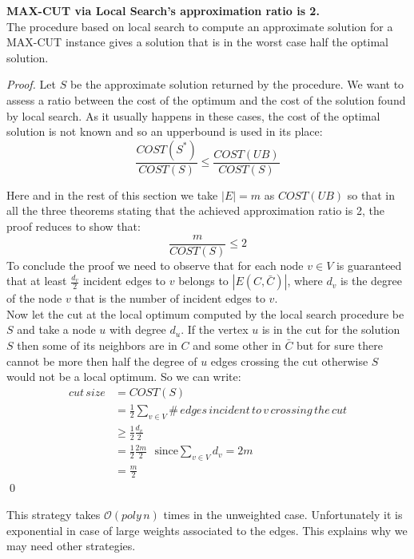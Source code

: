 \begin{theorem}{\textbf{MAX-CUT via Local Search's approximation ratio is 2.}}
\\
  The procedure based on local search to compute an approximate solution for a MAX-CUT instance gives a solution that is in the worst case half the optimal solution.
\end{theorem}
\begin{proof}
  Let $S$ be the approximate solution returned by the procedure.
  We want to assess a ratio between the cost of the optimum and the cost of the solution found by local search.
  As it usually happens in these cases, the cost of the optimal solution is not known and so an upperbound is used in its place:
  \[ \frac{COST(S^{*})}{COST(S)} \leq \frac{COST(UB)}{COST(S)} \]
  
  Here and in the rest of this section we take $|E|=m $ as $COST(UB)$ so that in all the three theorems stating that the achieved approximation ratio is 2, the proof reduces to show that:
  \[ \frac{m}{COST(S)} \leq 2 \]
  To conclude the proof we need to observe that for each node $v \in V$ is guaranteed that at least $\frac{d_v}{2}$ incident edges to $ v $ belongs to $|E(C,\bar{C})|$, where $ d_v $ is the degree of the node $ v $ that is the number of incident edges to $ v $.\\
  Now let the cut at the local optimum computed by the local search procedure be $ S $ and take a node $ u $ with degree $ d_u $. If the vertex $u$ is in the cut for the solution $S$ then some of its neighbors are in $C$ and some other in $\bar{C}$ but for sure there cannot be more then half the degree of $u$ edges crossing the cut otherwise $S$ would not be a local optimum.
  So we can write:
  \begin{align*}
  cut\, size & = COST(S) \\
             & = \frac{1}{2} \sum_{v \in V} \#\, edges\,incident\,to\,v \,crossing\, the\, cut \\
             & \geq \frac{1}{2} \frac{d_v}{2}  \\
             & = \frac{1}{2} \frac{2m}{2} \,\,\,\, \text{since} \sum_{v \in V} d_v = 2m\\
             & = \frac{m}{2}
  \end{align*}
  \qed
  
  
  
\end{proof}

This strategy takes $\mathcal{O}(poly\, n)$ times in the unweighted case. Unfortunately it is exponential in case of large weights associated to the edges. This explains why we may need other strategies.


